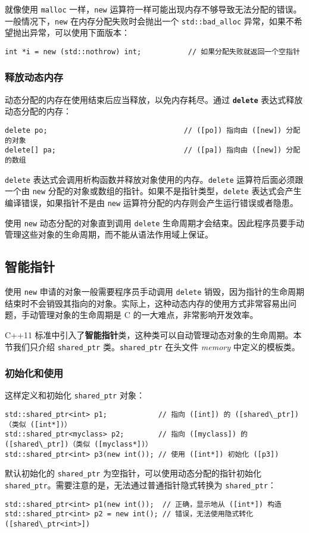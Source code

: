 \documentclass[hyperref,UTF8]{article}
\begin{document}
就像使用 \texttt{malloc} 一样，\texttt{new} 运算符一样可能出现内存不够导致无法分配的错误。一般情况下，\texttt{new} 在内存分配失败时会抛出一个 \texttt{std::bad\_alloc} 异常，如果不希望抛出异常，可以使用下面版本：
\begin{lstlisting}[numbers=none]
int *i = new (std::nothrow) int;           // 如果分配失败就返回一个空指针
\end{lstlisting}

\subsubsection{释放动态内存}

动态分配的内存在使用结束后应当释放，以免内存耗尽。通过 \textbf{\texttt{delete}} 表达式释放动态分配的内存：
\begin{lstlisting}[numbers=none]
delete po;                                // ([po]) 指向由 ([new]) 分配的对象
delete[] pa;                              // ([pa]) 指向由 ([new]) 分配的数组
\end{lstlisting}
\texttt{delete} 表达式会调用析构函数并释放对象使用的内存。\texttt{delete} 运算符后面必须跟一个由 \texttt{new} 分配的对象或数组的指针。如果不是指针类型，\texttt{delete} 表达式会产生编译错误，如果指针不是由 \texttt{new} 运算符分配的内存则会产生运行错误或者隐患。

使用 \texttt{new} 动态分配的对象直到调用 \texttt{delete} 生命周期才会结束。因此程序员要手动管理这些对象的生命周期，而不能从语法作用域上保证。

\subsection{智能指针}

使用 \texttt{new} 申请的对象一般需要程序员手动调用 \texttt{delete} 销毁，因为指针的生命周期结束时不会销毁其指向的对象。实际上，这种动态内存的使用方式非常容易出问题，手动管理对象的生命周期是 C 的一大难点，非常影响开发效率。

C++11 标准中引入了\textbf{智能指针}类，这种类可以自动管理动态对象的生命周期。本节我们只介绍 \texttt{shared\_ptr} 类。\texttt{shared\_ptr} 在头文件 \textsl{memory} 中定义的模板类。

\subsubsection{初始化和使用}

这样定义和初始化 \texttt{shared\_ptr} 对象：
\begin{lstlisting}
std::shared_ptr<int> p1;            // 指向 ([int]) 的 ([shared\_ptr])（类似 ([int*])）
std::shared_ptr<myclass> p2;        // 指向 ([myclass]) 的 ([shared\_ptr])（类似 ([myclass*])）
std::shared_ptr<int> p3(new int()); // 使用 ([int*]) 初始化 ([p3])
\end{lstlisting}
默认初始化的 \texttt{shared\_ptr} 为空指针，可以使用动态分配的指针初始化 \texttt{shared\_ptr}。需要注意的是，无法通过普通指针隐式转换为 \texttt{shared\_ptr}：
\begin{lstlisting}
std::shared_ptr<int> p1(new int());  // 正确，显示地从 ([int*]) 构造 
std::shared_ptr<int> p2 = new int(); // 错误，无法使用隐式转化 ([shared\_ptr<int>])
\end{lstlisting}
\end{document}
